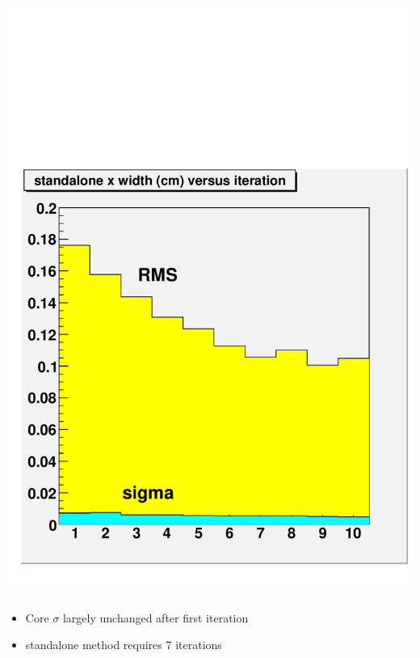 \documentclass[compress]{beamer}
\begin{document}
\begin{frame}
\begin{columns}
\begin{center}
\includegraphics[width=\linewidth]{realplots/x_width_vsiter_standalone}
\end{center}
\end{columns}
\begin{itemize}
\item Core $\sigma$ largely unchanged after first iteration
\item standalone method requires 7 iterations
\end{itemize}
\end{frame}
\end{document}
